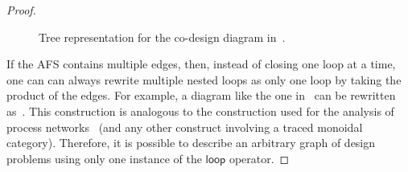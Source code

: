 \documentclass[twocolumn,english]{IEEEtran}
\theoremstyle{definition}
\theoremstyle{plain}
\theoremstyle{definition}
\theoremstyle{remark}
\theoremstyle{definition}
\theoremstyle{plain}
\theoremstyle{plain}
\newcommand{\aword}[1]{\mathsf{#1}}
\newcommand{\vmath}[1]{\aword{#1}}
\newcommand{\dploop}{\vmath{loop}}
\begin{document}
\begin{proof}
\begin{figure}[H]
\caption{Tree representation for the co-design diagram in~.}
\end{figure}

If the AFS contains multiple edges, then, instead of closing one loop
at a time, one can can always rewrite multiple nested loops as only
one loop by taking the product of the edges. For example, a diagram
like the one in~ can be rewritten as~.
This construction is analogous to the construction used for the analysis
of process networks~\cite{lee10} (and any other construct involving
a traced monoidal category). Therefore, it is possible to describe
an arbitrary graph of design problems using only one instance of the
$\dploop$ operator.
\end{proof}

\begin{figure}[H]


\end{figure}
\end{document}
